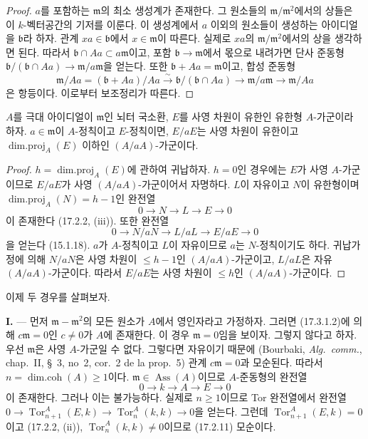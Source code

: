 \begin{proof}
$a$를 포함하는 $\mathfrak{m}$의 최소 생성계가 존재한다. 그 원소들의
$\mathfrak{m}/\mathfrak{m}^2$에서의 상들은 이 $k$-벡터공간의 기저를
이룬다. 이 생성계에서 $a$ 이외의 원소들이 생성하는 아이디얼을
$\mathfrak{b}$라 하자. 관계 $xa\in\mathfrak{b}$에서
$x\in\mathfrak{m}$이 따른다. 실제로 $xa$의
$\mathfrak{m}/\mathfrak{m}^2$에서의 상을 생각하면 된다. 따라서
$\mathfrak{b}\cap Aa\subset a\mathfrak{m}$이고, 포함
$\mathfrak{b}\longrightarrow\mathfrak{m}$에서 몫으로 내려가면 단사
준동형
$\mathfrak{b}/(\mathfrak{b}\cap Aa)\longrightarrow
\mathfrak{m}/a\mathfrak{m}$을 얻는다. 또한
$\mathfrak{b}+Aa=\mathfrak{m}$이고, 합성 준동형
\[
  \mathfrak{m}/Aa=(\mathfrak{b}+Aa)/Aa
  \xrightarrow{\sim}\mathfrak{b}/(\mathfrak{b}\cap Aa)
  \longrightarrow\mathfrak{m}/a\mathfrak{m}
  \longrightarrow\mathfrak{m}/Aa
\]
은 항등이다. 이로부터 보조정리가 따른다.
\end{proof}

\begin{lemma}[17.3.1.4]
\label{0.17.3.1.4-fr}
$A$를 극대 아이디얼이 $\mathfrak{m}$인 뇌터 국소환, $E$를 사영
차원이 유한인 유한형 $A$-가군이라 하자. $a\in\mathfrak{m}$이
$A$-정칙이고 $E$-정칙이면, $E/aE$는 사영 차원이 유한이고
$\operatorname{dim.proj}_A(E)$ 이하인 $(A/aA)$-가군이다.
\end{lemma}

\begin{proof}
$h=\operatorname{dim.proj}_A(E)$에 관하여 귀납하자. $h=0$인 경우에는
$E$가 사영 $A$-가군이므로 $E/aE$가 사영 $(A/aA)$-가군이어서 자명하다.
$L$이 자유이고 $N$이 유한형이며
$\operatorname{dim.proj}_A(N)=h-1$인 완전열
\[
  0\longrightarrow N\longrightarrow L\longrightarrow E\longrightarrow0
\]
이 존재한다 (17.2.2, (iii)). 또한 완전열
\[
  0\longrightarrow N/aN\longrightarrow L/aL\longrightarrow E/aE
  \longrightarrow0
\]
을 얻는다 (15.1.18). $a$가 $A$-정칙이고 $L$이 자유이므로 $a$는
$N$-정칙이기도 하다. 귀납가정에 의해 $N/aN$은 사영 차원이
$\leq h-1$인 $(A/aA)$-가군이고, $L/aL$은 자유 $(A/aA)$-가군이다.
따라서 $E/aE$는 사영 차원이 $\leq h$인 $(A/aA)$-가군이다.
\end{proof}

이제 두 경우를 살펴보자.

\medskip\noindent\textbf{I.} --- 먼저
$\mathfrak{m}-\mathfrak{m}^2$의 모든 원소가 $A$에서 영인자라고
가정하자. 그러면 (17.3.1.2)에 의해 $c\mathfrak{m}=0$인
$c\neq0$가 $A$에 존재한다. 이 경우 $\mathfrak{m}=0$임을 보이자.
그렇지 않다고 하자. 우선 $\mathfrak{m}$은 사영 $A$-가군일 수 없다.
그렇다면 자유이기 때문에 (Bourbaki, \emph{Alg.~comm.}, chap.~II,
\S~3, no~2, cor.~2 de la prop.~5) 관계 $c\mathfrak{m}=0$과 모순된다.
따라서 $n=\operatorname{dim.coh}(A)\geq1$이다.
$\mathfrak{m}\in\operatorname{Ass}(A)$이므로 $A$-준동형의 완전열
\[
  0\longrightarrow k\longrightarrow A\longrightarrow E\longrightarrow0
\]
이 존재한다. 그러나 이는 불가능하다. 실제로 $n\geq1$이므로 Tor
완전열에서 완전열
$0\longrightarrow\operatorname{Tor}^A_{n+1}(E,k)
\longrightarrow\operatorname{Tor}^A_n(k,k)\longrightarrow0$을 얻는다.
그런데 $\operatorname{Tor}^A_{n+1}(E,k)=0$이고 (17.2.2, (ii)),
$\operatorname{Tor}^A_n(k,k)\neq0$이므로 (17.2.11) 모순이다.


